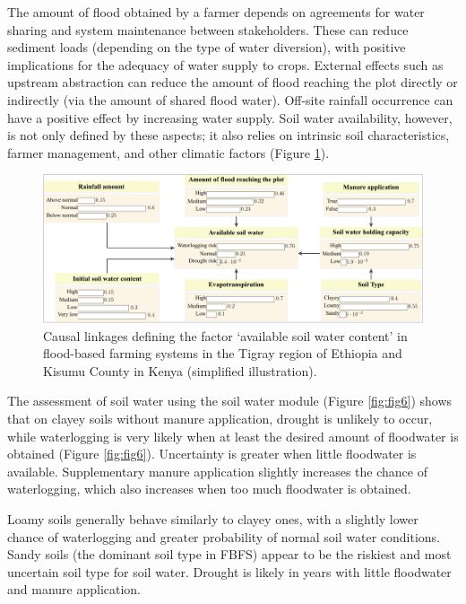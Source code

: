 \documentclass[]{elsarticle} %
\begin{document}
The amount of flood obtained by a farmer depends on agreements for water sharing and system maintenance between stakeholders. These can reduce sediment loads (depending on the type of water diversion), with positive implications for the adequacy of water supply to crops. External effects such as upstream abstraction can reduce the amount of flood reaching the plot directly or indirectly (via the amount of shared flood water). Off-site rainfall occurrence can have a positive effect by increasing water supply. Soil water availability, however, is not only defined by these aspects; it also relies on intrinsic soil characteristics, farmer management, and other climatic factors (Figure \ref{fig:fig5}).

\begin{figure}[!h]

{\centering \includegraphics[width=1\linewidth,]{figures/available-soil-water-1} 

}

\caption{Causal linkages defining the factor ‘available soil water content’ in flood-based farming systems in the Tigray region of Ethiopia and Kisumu County in Kenya (simplified illustration).}\label{fig:fig5}
\end{figure}

The assessment of soil water using the soil water module (Figure \ref{fig:fig6}) shows that on clayey soils without manure application, drought is unlikely to occur, while waterlogging is very likely when at least the desired amount of floodwater is obtained (Figure \ref{fig:fig6}). Uncertainty is greater when little floodwater is available. Supplementary manure application slightly increases the chance of waterlogging, which also increases when too much floodwater is obtained.

Loamy soils generally behave similarly to clayey ones, with a slightly lower chance of waterlogging and greater probability of normal soil water conditions. Sandy soils (the dominant soil type in FBFS) appear to be the riskiest and most uncertain soil type for soil water. Drought is likely in years with little floodwater and manure application.
\end{document}
